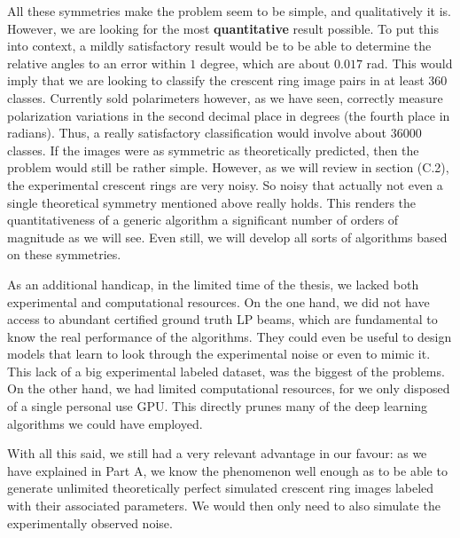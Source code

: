 \documentclass[11pt, a4paper, twoside]{article} %
\begin{document}

All these symmetries make the problem seem to be simple, and qualitatively it is. However, we are looking for the most {\bf quantitative} result possible. To put this into context, a mildly satisfactory result would be to be able to determine the relative angles to an error within $1$ degree, which are about $0.017$ rad. This would imply that we are looking to classify the crescent ring image pairs in at least 360 classes. Currently sold polarimeters however, as we have seen, correctly measure polarization variations in the second decimal place in degrees (the fourth place in radians). Thus, a really satisfactory classification would involve about 36000 classes. If the images were as symmetric as theoretically predicted, then the problem would still be rather simple. However, as we will review in section (C.2), the experimental crescent rings are very noisy. So noisy that actually not even a single theoretical symmetry mentioned above really holds. This renders the quantitativeness of a generic algorithm a significant number of orders of magnitude as we will see. Even still, we will develop all sorts of algorithms based on these symmetries.

As an additional handicap, in the limited time of the thesis, we lacked both experimental and computational resources. On the one hand, we did not have access to abundant certified ground truth LP beams, which are fundamental to know the real performance of the algorithms. They could even be useful to design models that learn to look through the experimental noise or even to mimic it. This lack of a big experimental labeled dataset, was the biggest of the problems. On the other hand, we had limited computational resources, for we only disposed of a single personal use GPU. This directly prunes many of the deep learning algorithms we could have employed.


With all this said, we still had a very relevant advantage in our favour: as we have explained in Part A, we know the phenomenon well enough as to be able to generate unlimited theoretically perfect simulated crescent ring images labeled with their associated parameters. We would then only need to also simulate the experimentally observed noise.
\vspace{-0.3cm}
\end{document}
